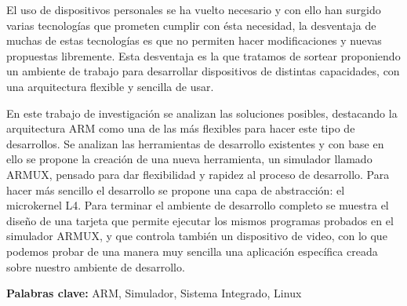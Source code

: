 \begin{addmargin}[-1cm]{-3cm}
\begin{center}
\end{center}


El uso de dispositivos personales se ha vuelto necesario y con ello han surgido varias tecnologías que prometen cumplir con ésta necesidad, la desventaja de muchas de estas tecnologías es que no permiten hacer modificaciones y nuevas propuestas libremente. Esta desventaja es la que tratamos de sortear proponiendo un ambiente de trabajo para desarrollar dispositivos de distintas capacidades, con una arquitectura flexible y sencilla de usar.

En este trabajo de investigación se analizan las soluciones posibles, destacando la arquitectura ARM como una de las más flexibles para hacer este tipo de desarrollos. Se analizan las herramientas de desarrollo existentes y con base en ello se propone la creación de una nueva herramienta, un simulador llamado ARMUX, pensado para dar flexibilidad y rapidez al proceso de desarrollo. Para hacer más sencillo el desarrollo se propone una capa de abstracción: el microkernel L4. Para terminar el ambiente de desarrollo completo se muestra el diseño de una tarjeta que permite ejecutar los mismos programas probados en el simulador ARMUX, y que controla también un dispositivo de video, con lo que podemos probar de una manera muy sencilla una aplicación específica creada sobre nuestro ambiente de desarrollo.

\vfill

\small

\textbf{Palabras clave:} ARM, Simulador, Sistema Integrado, Linux

\end{addmargin}

\endgroup

